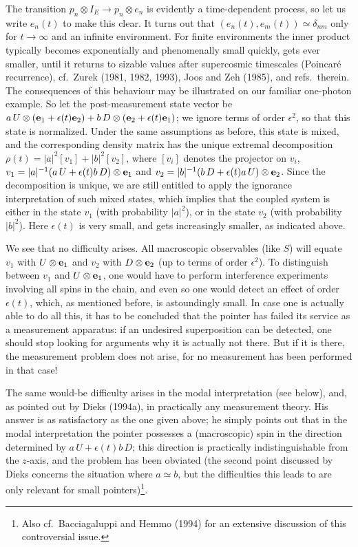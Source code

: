 \documentclass[12pt,titlepage]{article}
\newcommand{\dl}{\delta}
\newcommand{\ep}{\epsilon}
\newcommand{\rh}{\rho}
\newcommand{\raw}{\rightarrow}
\newcommand{\fn}{\footnote}
\newcommand{\ot}{\otimes}
\begin{document}
The transition $p_n\ot I_E\raw p_n\ot e_n$ is evidently a time-dependent
process, so let us write
$e_n(t)$ to make this clear. It turns out that $(e_n(t),e_m(t))\simeq \dl_{nm}$
only for $t\raw
\infty$ and an infinite environment. For finite environments the inner product
typically becomes
exponentially and phenomenally small quickly, gets ever smaller, until it
returns to sizable values
after supercosmic timescales (Poincar\'{e} recurrence), cf.\  Zurek (1981,
1982, 1993), Joos and Zeh
(1985), and refs.\ therein. The consequences of this behaviour may be
illustrated on our familiar
one-photon example. So let the post-measurement state vector be $a\, U\ot ({\bf
e}_1+\ep(t){\bf e}_2)
+ b\, D\ot ({\bf e}_2+\ep(t){\bf e}_1)$; we ignore terms of order $\ep^2$, so
that this state is
normalized. Under  the same assumptions as before, this state is mixed, and the
corresponding density
matrix has the unique extremal decomposition $\rh(t)=|a|^2 [v_1]
+|b|^2[v_2]$, where $[v_i]$ denotes the projector on $v_i$,
$v_1=|a|^{-1}( a\, U+\ep(t)b\, D)\ot {\bf e}_1$ and  $v_2= |b|^{-1}( b\, D
+\ep(t)a\, U)\ot {\bf
e}_2$.
  Since the decomposition is unique, we are still entitled to apply the
ignorance interpretation of
such mixed states, which implies that the coupled system is either in the state
$v_1$ (with
probability $|a|^2$), or in the state $v_2$ (with probability $|b|^2$). Here
$\ep(t)$ is
very small,
 and gets increasingly smaller, as indicated above.

We see that no difficulty arises. All macroscopic observables (like $S$) will
equate $v_1$ with
$U\ot {\bf e}_1$ and $v_2$ with $D\ot {\bf e}_2$ (up to terms of order
$\ep^2$). To distinguish
between $v_1$ and  $U\ot {\bf e}_1$, one would have to perform interference
experiments involving
all spins in the chain, and even so one would detect an effect of order
$\ep(t)$, which, as
mentioned before, is astoundingly small. In case one is actually able to do all
this, it has to be
concluded that the pointer has failed its service as a measurement apparatus:
if an undesired
superposition can be detected, one should stop looking for arguments why it is
actually not there.
But if it is there, the measurement problem does not arise, for no measurement
has been performed in
that case!

The same would-be difficulty arises in the modal interpretation (see below),
and, as pointed out by
Dieks (1994a), in practically any measurement theory. His answer is as
satisfactory as the one given
above; he simply points out that in the modal interpretation the pointer
possesses a (macroscopic)
spin in the direction determined by $ a\, U+\ep(t)b\, D$; this direction is
practically
indistinguishable from the $z$-axis, and the problem has been obviated (the
second point discussed by
Dieks concerns the situation where $a\simeq b$, but the difficulties this leads
to are only relevant
for small pointers)\fn{Also cf.\ Bacciagaluppi and Hemmo (1994) for an
extensive discussion of this
controversial issue.}.
\end{document}
